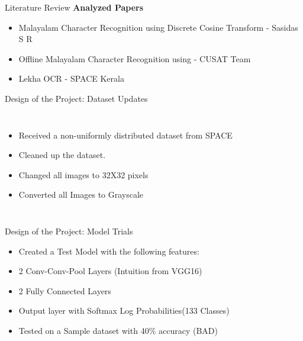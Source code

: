 \documentclass{beamer}
\begin{document}
\begin{frame}{Literature Review}
    \textbf{Analyzed Papers}
    \begin{itemize}
         \item
         Malayalam Character Recognition using Discrete
Cosine Transform - Sasidas S R
        \item Offline Malayalam Character Recognition using - CUSAT Team
         \item Lekha OCR - SPACE Kerala
    \end{itemize}
    
     
\end{frame}

\begin{frame}{Design of the Project: Dataset Updates}

    \begin{columns}[c] %
    \column{\textwidth} %
    \begin{itemize}
        \item Received a non-uniformly distributed dataset from SPACE
        \item Cleaned up the dataset.

        \item Changed all images to 32X32 pixels

        \item Converted all Images to Grayscale

    \end{itemize}
     
    \end{columns}
\end{frame}



\begin{frame}{Design of the Project: Model Trials}
     \begin{itemize}
        \item Created a Test Model with the following features: 
        \item 2 Conv-Conv-Pool Layers (Intuition from VGG16)

        \item 2 Fully Connected Layers

        \item Output layer with Softmax Log Probabilities(133 Classes)
        
        \item Tested on a Sample dataset with 40\% accuracy (BAD)


    \end{itemize}
\end{frame}
\end{document}
